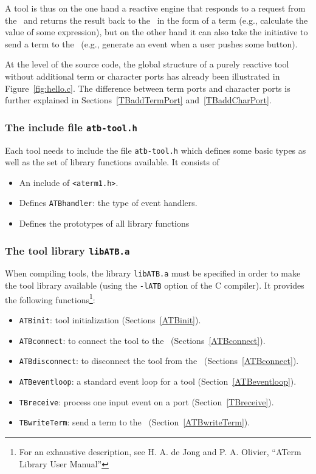 \documentclass[a4,twoside,noweb]{article} %
\begin{document}
A tool is thus on the one hand a reactive engine that responds to a
request from the \TB\ and returns the result back to the \TB\ in the
form of a term (e.g., calculate the value of some expression), but on
the other hand it can also take the initiative to send a term to the
\TB\   (e.g., generate an event when a user pushes some button).

At the level of the source code, the global structure of a purely
reactive tool without additional term or character ports
has already
been illustrated in Figure~\ref{fig:hello.c}.
The difference between term ports and character ports is further explained in 
Sections~\ref{TBaddTermPort} and~\ref{TBaddCharPort}.

\subsubsection{The include file {\tt atb-tool.h}}

Each tool needs to include the file {\tt atb-tool.h}
which defines some basic types as well as the set
of library functions available.
It consists of
\begin{itemize}
\item An include of {\tt <aterm1.h>}.
\item Defines {\tt ATBhandler}: the type of event handlers.
\item Defines the prototypes of all library functions
\end{itemize}

\subsubsection{The tool library {\tt libATB.a}}

When compiling tools, the library {\tt libATB.a} must be specified in order to
make the tool library available (using the {\tt -lATB} option of the C
compiler). It provides the following functions\footnote{For an
  exhaustive description, see H. A. de Jong and P. A. Olivier, ``ATerm Library
  User Manual''}:

\begin{itemize}
\item {\tt ATBinit}: tool initialization (Sections~\ref{ATBinit}).

\item {\tt ATBconnect}: to connect the tool to the \TB\
  (Sections~\ref{ATBconnect}).

\item {\tt ATBdisconnect}: to disconnect the tool from the \TB\ (Sections~\ref{ATBconnect}).

\item {\tt ATBeventloop}: a standard event loop for a tool
  (Section~\ref{ATBeventloop}).

\item {\tt TBreceive}: process one input event on a port (Section~\ref{TBreceive}).

\item {\tt TBwriteTerm}: send a term to the \TB\ (Section~\ref{ATBwriteTerm}).

\end{itemize}
\end{document}
